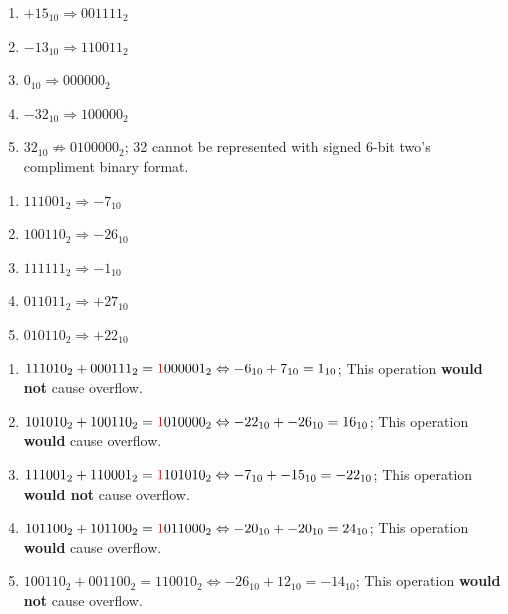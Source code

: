\documentclass{homework}
\begin{document}

\begin{enumerate}
\item $+15_{10} \Rightarrow 001111_2$
\item $-13_{10} \Rightarrow 110011_2$
\item $0_{10} \Rightarrow 000000_2$
\item $-32_{10} \Rightarrow 100000_2$
\item $32_{10} \not \Rightarrow 0100000_2$; 32 cannot be represented with signed 6-bit two's compliment binary format.
\end{enumerate}


\begin{enumerate}
\item $111001_2 \Rightarrow -7_{10}$
\item $100110_2 \Rightarrow -26_{10}$
\item $111111_2 \Rightarrow -1_{10}$
\item $011011_2 \Rightarrow +27_{10}$
\item $010110_2 \Rightarrow +22_{10}$
\end{enumerate}


\begin{enumerate}
\item $111010_2 + 000111_2 = \textcolor{red}{1}000001_2 \Leftrightarrow -6_{10} + 7_{10} = 1_{10}$; This operation \textbf{would not} cause overflow.
\item $101010_2 + 100110_2 = \textcolor{red}{1}010000_2 \Leftrightarrow -22_{10} + -26_{10} = 16_{10}$; This operation \textbf{would} cause overflow.
\item $111001_2 + 110001_2 = \textcolor{red}{1}101010_2 \Leftrightarrow -7_{10} + -15_{10} = -22_{10}$; This operation \textbf{would not} cause overflow.
\item $101100_2 + 101100_2 = \textcolor{red}{1}011000_2 \Leftrightarrow -20_{10} + -20_{10} = 24_{10}$; This operation \textbf{would} cause overflow.
\item $100110_2 + 001100_2 = 110010_2 \Leftrightarrow -26_{10} + 12_{10} =-14_{10}$; This operation \textbf{would not} cause overflow.
\end{enumerate}
\end{document}
